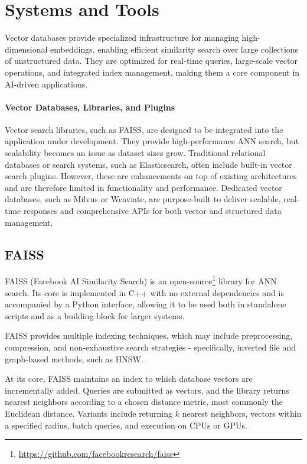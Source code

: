\section{Systems and Tools}

Vector databases provide specialized infrastructure for managing high-dimensional embeddings, enabling efficient similarity search over large collections of unstructured data. They are optimized for real-time queries, large-scale vector operations, and integrated index management, making them a core component in AI-driven applications.

\paragraph{Vector Databases, Libraries, and Plugins}

Vector search libraries, such as FAISS, are designed to be integrated into the application under development. They provide high-performance ANN search, but scalability becomes an issue as dataset sizes grow.
Traditional relational databases or search systems, such as Elasticsearch, often include built-in vector search plugins. However, these are enhancements on top of existing architectures and are therefore limited in functionality and performance.
Dedicated vector databases, such as Milvus or Weaviate, are purpose-built to deliver scalable, real-time responses and comprehensive APIs for both vector and structured data management.

\subsection{FAISS}

FAISS (Facebook AI Similarity Search) is an open-source\footnote{\url{https://github.com/facebookresearch/faiss}} library for ANN search. Its core is implemented in C++ with no external dependencies and is accompanied by a Python interface, allowing it to be used both in standalone scripts and as a building block for larger systems.

FAISS provides multiple indexing techniques, which may include preprocessing, compression, and non-exhaustive search strategies - specifically, inverted file and graph-based methods, such as HNSW.

At its core, FAISS maintains an index to which database vectors are incrementally added. Queries are submitted as vectors, and the library returns nearest neighbors according to a chosen distance metric, most commonly the Euclidean distance. Variants include returning $k$ nearest neighbors, vectors within a specified radius, batch queries, and execution on CPUs or GPUs.

